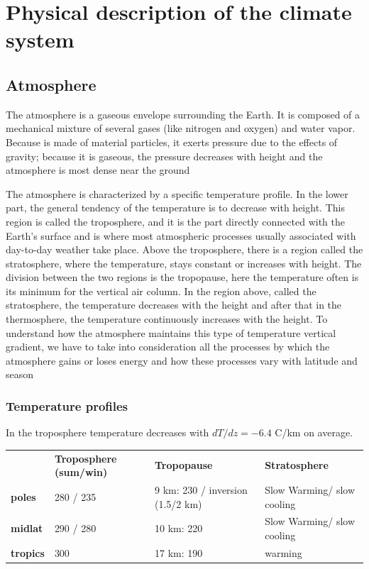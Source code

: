 \chapter{Physical description of the climate system}
\section{Atmosphere}
The atmosphere is a gaseous envelope surrounding the Earth. It is composed of a mechanical mixture of several gases (like nitrogen and oxygen) and water vapor. Because is made of material particles, it exerts pressure due to the effects of gravity; because it is gaseous, the pressure decreases with height and the atmosphere is most dense near the ground

The atmosphere is characterized by a specific temperature profile. In the lower part, the general tendency of the temperature is to decrease with height. This region is called the troposphere, and it is the part directly connected with the Earth’s surface and is where most atmospheric processes usually associated with day-to-day weather take place. Above the troposphere, there is a region called the stratosphere, where the temperature, stays constant or increases with height. The division between the two regions is the tropopause, here the temperature often is its minimum for the vertical air column. In the region above, called the stratosphere, the temperature decreases with the height and after that in the thermosphere, the temperature continuously increases with the height. To understand how the atmosphere maintains this type of temperature vertical gradient, we have to take into consideration all the processes by which the atmosphere gains or loses energy and how these processes vary with latitude and season 

\subsection{Temperature profiles}
In the troposphere temperature decreases with $dT/dz=-6.4$ C/km on average.
\begin{table}[h]
\begin{tabular}{llll}
                                                             & {\color[HTML]{010066} \textbf{Troposphere (sum/win)}} & {\color[HTML]{010066} \textbf{Tropopause}} & {\color[HTML]{010066} \textbf{Stratosphere}} \\ \cline{2-4} 
\multicolumn{1}{l|}{{\color[HTML]{003532} \textbf{poles}}}   & 280 / 235                                             & 9 km: 230 / inversion (1.5/2 km)           & Slow Warming/ slow cooling                   \\
\multicolumn{1}{l|}{{\color[HTML]{003532} \textbf{midlat}}}  & 290 / 280                                             & 10 km: 220                                 & Slow Warming/ slow cooling                   \\
\multicolumn{1}{l|}{{\color[HTML]{003532} \textbf{tropics}}} & 300                                                   & 17 km: 190                                 & warming                                     
\end{tabular}
\end{table}

